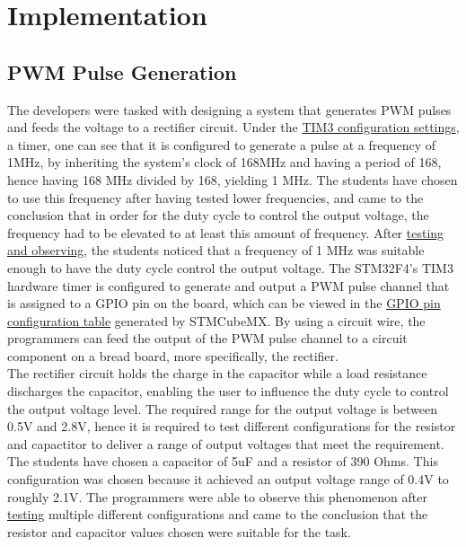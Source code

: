 \documentclass[12pt]{report}
\begin{document}
\section{Implementation}

\subsection{PWM Pulse Generation}
The developers were tasked with designing a system that generates PWM pulses and feeds the voltage to a rectifier circuit. Under the \hyperref[appendixtim2]{TIM3 configuration settings}, a timer, one can see that it is configured to generate a pulse at a frequency of 1MHz, by inheriting the system's clock of 168MHz and having a period of 168, hence having 168 MHz divided by 168, yielding 1 MHz. The students have chosen to use this frequency after having tested lower frequencies, and came to the conclusion that in order for the duty cycle to control the output voltage, the frequency had to be elevated to at least this amount of frequency. After \hyperref[testpwm]{testing and observing}, the students noticed that a frequency of 1 MHz was suitable enough to have the duty cycle control the output voltage. The STM32F4's TIM3 hardware timer is configured to generate and output a PWM pulse channel that is assigned to a GPIO pin on the board, which can be viewed in the \hyperref[pinconfig]{GPIO pin configuration table} generated by STMCubeMX. By using a circuit wire, the programmers can feed the output of the PWM pulse channel to a circuit component on a bread board, more specifically, the rectifier.\\
The rectifier circuit holds the charge in the capacitor while a load resistance discharges the capacitor, enabling the user to influence the duty cycle to control the output voltage level. The required range for the output voltage is between 0.5V and 2.8V, hence it is required to test different configurations for the resistor and capactitor to deliver a range of output voltages that meet the requirement. The students have chosen a capacitor of 5uF and a resistor of 390 Ohms. This configuration was chosen because it achieved an output voltage range of 0.4V to roughly 2.1V. The programmers were able to observe this phenomenon after \hyperref[testpwm]{testing} multiple different configurations and came to the conclusion that the resistor and capacitor values chosen were suitable for the task.
\end{document}
